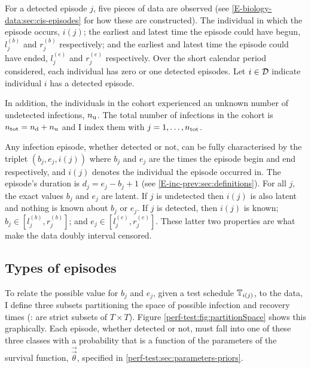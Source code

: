 \documentclass[thesis.tex]{subfiles}
\begin{document}
For a detected episode $j$, five pieces of data are observed (see \cref{E-biology-data:sec:cis-episodes} for how these are constructed).
The individual in which the episode occurs, $i(j)$; the earliest and latest time the episode could have begun, $l_j^{(b)}$ and $r_j^{(b)}$ respectively; and the earliest and latest time the episode could have ended, $l_j^{(e)}$ and $r_j^{(e)}$ respectively.
Over the short calendar period considered, each individual has zero or one detected episodes.
Let $i \in \mathcal{D}$ indicate individual $i$ has a detected episode.

In addition, the individuals in the cohort experienced an unknown number of undetected infections, $n_\text{u}$.
The total number of infections in the cohort is $n_\text{tot} = n_\text{d} + n_\text{u}$ and I index them with $j = 1, \dots, n_\text{tot}$.

Any infection episode, whether detected or not, can be fully characterised by the triplet $(b_j, e_j, i(j))$ where $b_j$ and $e_j$ are the times the episode begin and end respectively, and $i(j)$ denotes the individual the episode occurred in.
The episode's duration is $d_j = e_j - b_j + 1$ (see \cref{E-inc-prev:sec:definitions}).
For all $j$, the exact values $b_j$ and $e_j$ are latent.
If $j$ is undetected then $i(j)$ is also latent and nothing is known about $b_j$ or $e_j$.
If $j$ is detected, then $i(j)$ is known; $b_j \in [l_j^{(b)}, r_j^{(b)}]$; and $e_j \in [l_j^{(e)}, r_j^{(e)}]$.
These latter two properties are what make the data doubly interval censored.

\subsection{Types of episodes} \label{perf-test:sec:episode-types}

To relate the possible value for $b_j$ and $e_j$, given a test schedule $\mathbb{T}_{i(j)}$, to the data, I define three subsets partitioning the space of possible infection and recovery times (\ie: are strict subsets of $T \times T$).
Figure \ref{perf-test:fig:partitionSpace} shows this graphically.
Each episode, whether detected or not, must fall into one of these three classes with a probability that is a function of the parameters of the survival function, $\vec{\vec{\theta}}$, specified in \cref{perf-test:sec:parameters-priors}.
\end{document}
